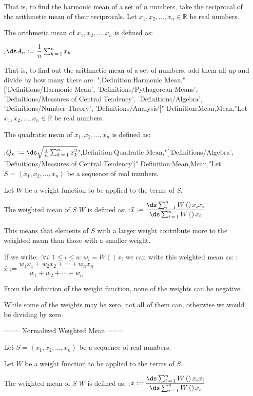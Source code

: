 That is, to find the harmonic mean of a set of $n$ numbers, take the reciprocal of the arithmetic mean of their reciprocals.
Let $x_1, x_2, \ldots, x_n \in \mathbb R$ be real numbers.

The arithmetic mean of $x_1, x_2, \ldots, x_n$ is defined as:

:$\ds A_n := \dfrac 1 n \sum_{k \mathop = 1}^n x_k$

That is, to find out the arithmetic mean of a set of numbers, add them all up and divide by how many there are.
",Definition:Harmonic Mean,"['Definitions/Harmonic Mean', 'Definitions/Pythagorean Means', 'Definitions/Measures of Central Tendency', 'Definitions/Algebra', 'Definitions/Number Theory', 'Definitions/Analysis']"
Definition:Mean,Mean,"Let $x_1, x_2, \ldots, x_n \in \mathbb R$ be real numbers.

The quadratic mean of $x_1, x_2, \ldots, x_n$ is defined as:

:$Q_n := \ds \sqrt {\frac 1 n \sum_{k \mathop = 1}^n x_k^2}$",Definition:Quadratic Mean,"['Definitions/Algebra', 'Definitions/Measures of Central Tendency']"
Definition:Mean,Mean,"Let $S = \left\langle x_1, x_2, \ldots, x_n \right\rangle$ be a sequence of real numbers.

Let $W$ be a weight function to be applied to the terms of $S$.


The weighted mean of $S$  $W$ is defined as:
:$\bar x := \dfrac {\ds \sum_{i \mathop = 1}^n W \left(   \right){x_i} x_i} {\ds \sum_{i \mathop = 1}^n W \left(   \right){x_i} }$

This means that elements of $S$ with a larger weight contribute more to the weighted mean than those with a smaller weight.


If we write:
:$\forall i: 1 \le i \le n: w_i = W \left(   \right){x_i}$
we can write this weighted mean as:
:$\bar x := \dfrac {w_1 x_1 + w_2 x_2 + \cdots + w_n x_n} {w_1 + w_2 + \cdots + w_n}$


From the definition of the weight function, none of the weights can be negative.

While some of the weights may be zero, not all of them can, otherwise we would be dividing by zero.


=== Normalized Weighted Mean ===

Let $S = \left\langle x_1, x_2, \ldots, x_n \right\rangle$ be a sequence of real numbers.

Let $W$ be a weight function to be applied to the terms of $S$.


The weighted mean of $S$  $W$ is defined as:
:$\bar x := \dfrac {\ds \sum_{i \mathop = 1}^n W \left(   \right){x_i} x_i} {\ds \sum_{i \mathop = 1}^n W \left(   \right){x_i} }$

